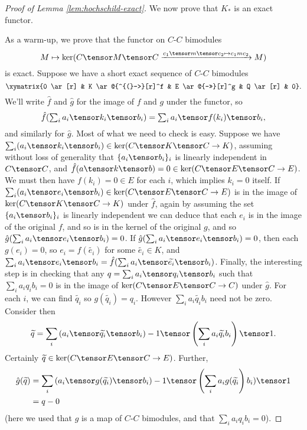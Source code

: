 \begin{proof}[Proof of Lemma \ref{lem:hochschild-exact}]
We now prove that $K_*$ is an exact functor.

As a warm-up, we prove
that the functor on $C$-$C$ bimodules
\begin{equation*}
M \mapsto \ker(C \tensor M \tensor C \xrightarrow{c_1 \tensor m \tensor c_2 \mapsto c_1 m c_2} M)
\end{equation*}
is exact.
Suppose we have a short exact sequence of $C$-$C$ bimodules $$\xymatrix{0 \ar[r] & K \ar@{^{(}->}[r]^f & E \ar@{->>}[r]^g & Q \ar[r] & 0}.$$
We'll write $\hat{f}$ and $\hat{g}$ for the image of $f$ and $g$ under the functor, so 
\[
	\hat{f}(\textstyle\sum_i a_i \tensor k_i \tensor b_i) = 
						\textstyle\sum_i a_i \tensor f(k_i) \tensor b_i ,
\]
and similarly for $\hat{g}$.
Most of what we need to check is easy.
Suppose we have $\sum_i (a_i \tensor k_i \tensor b_i) \in \ker(C \tensor K \tensor C \to K)$, 
assuming without loss of generality that $\{a_i \tensor b_i\}_i$ is linearly independent in $C \tensor C$, 
and $\hat{f}(a \tensor k \tensor b) = 0 \in \ker(C \tensor E \tensor C \to E)$.
We must then have $f(k_i) = 0 \in E$ for each $i$, which implies $k_i=0$ itself. 
If $\sum_i (a_i \tensor e_i \tensor b_i) \in \ker(C \tensor E \tensor C \to E)$ 
is in the image of $\ker(C \tensor K \tensor C \to K)$ under $\hat{f}$, 
again by assuming the set  $\{a_i \tensor b_i\}_i$ is linearly independent we can deduce that each
$e_i$ is in the image of the original $f$, and so is in the kernel of the original $g$, 
and so $\hat{g}(\sum_i a_i \tensor e_i \tensor b_i) = 0$.
If $\hat{g}(\sum_i a_i \tensor e_i \tensor b_i) = 0$, then each $g(e_i) = 0$, so $e_i = f(\widetilde{e_i})$ 
for some $\widetilde{e_i} \in K$, and $\sum_i a_i \tensor e_i \tensor b_i = \hat{f}(\sum_i a_i \tensor \widetilde{e_i} \tensor b_i)$.
Finally, the interesting step is in checking that any $q = \sum_i a_i \tensor q_i \tensor b_i$ 
such that $\sum_i a_i q_i b_i = 0$ is in the image of $\ker(C \tensor E \tensor C \to C)$ under $\hat{g}$.
For each $i$, we can find $\widetilde{q_i}$ so $g(\widetilde{q_i}) = q_i$.
However $\sum_i a_i \widetilde{q_i} b_i$ need not be zero.
Consider then $$\widetilde{q} = \sum_i \left(a_i \tensor \widetilde{q_i} \tensor b_i\right) - 1 \tensor \left(\sum_i a_i \widetilde{q_i} b_i\right) \tensor 1.$$ Certainly
$\widetilde{q} \in \ker(C \tensor E \tensor C \to E)$.
Further,
\begin{align*}
\hat{g}(\widetilde{q}) & = \sum_i \left(a_i \tensor g(\widetilde{q_i}) \tensor b_i\right) - 1 \tensor \left(\sum_i a_i g(\widetilde{q_i}\right) b_i) \tensor 1 \\
                       & = q - 0
\end{align*}
(here we used that $g$ is a map of $C$-$C$ bimodules, and that $\sum_i a_i q_i b_i = 0$).


\end{proof}
